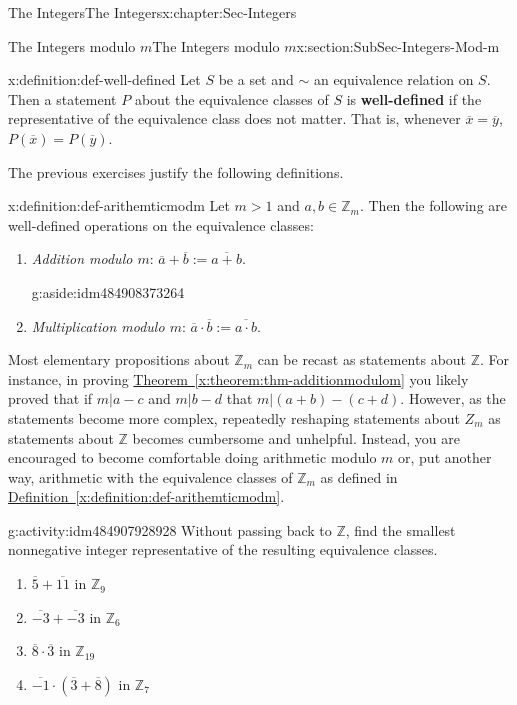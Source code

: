 \documentclass[oneside,10pt,]{book}
\newcommand{\xreffont}{\relax}
\newcommand{\terminology}[1]{\textbf{#1}}
\numberwithin{equation}{section}
\def\Z{{\mathbb Z}}
\begin{document}
\begin{chapterptx}{The Integers}{}{The Integers}{}{}{x:chapter:Sec-Integers}
\begin{sectionptx}{The Integers modulo \(m\)}{}{The Integers modulo \(m\)}{}{}{x:section:SubSec-Integers-Mod-m}
\begin{definition}{}{x:definition:def-well-defined}
%
Let \(S\) be a set and \(\sim\) an equivalence relation on \(S\). Then a statement \(P\) about the equivalence classes of \(S\) is \terminology{well-defined} if the representative of the equivalence class does not matter. That is, whenever \(\overline{x} = \overline{y}\), \(P(\overline{x}) = P(\overline{y})\).%
\end{definition}
The previous exercises justify the following definitions.%
\begin{definition}{}{x:definition:def-arithemticmodm}%
Let \(m > 1\) and \(a,b\in \Z_m\). Then the following are well-defined operations on the equivalence classes:%
\begin{enumerate}
\item{}\emph{Addition modulo \(m\)}: \(\overline{a} + \overline{b} := \overline{a+b}\). \begin{aside}{}{g:aside:idm484908373264}%
\end{aside}
%
\item{}\emph{Multiplication modulo \(m\)}: \(\overline{a}\cdot \overline{b} := \overline{a\cdot b}\).%
\end{enumerate}
%
\end{definition}
Most elementary propositions about \(\Z_m\) can be recast as statements about \(\Z\). For instance, in proving \hyperref[x:theorem:thm-additionmodulom]{Theorem~{\xreffont\ref{x:theorem:thm-additionmodulom}}} you likely proved that if \(m|a-c\) and \(m|b-d\) that \(m|(a+b)-(c+d)\). However, as the statements become more complex, repeatedly reshaping statements about \(Z_m\) as statements about \(\Z\) becomes cumbersome and unhelpful. Instead, you are encouraged to become comfortable doing arithmetic modulo \(m\) or, put another way, arithmetic with the equivalence classes of \(\Z_m\) as defined in \hyperref[x:definition:def-arithemticmodm]{Definition~{\xreffont\ref{x:definition:def-arithemticmodm}}}.%
\begin{activity}{}{g:activity:idm484907928928}%
Without passing back to \(\Z\), find the smallest nonnegative integer representative of the resulting equivalence classes.%
%
\begin{enumerate}
\item{}\(\overline{5}+\overline{11}\) in \(\Z_{9}\)%
\item{}\(\overline{-3}+\overline{-3}\) in \(\Z_{6}\)%
\item{}\(\overline{8}\cdot\overline{3}\) in \(\Z_{19}\)%
\item{}\(\overline{-1}\cdot(\overline{3}+\overline{8})\) in \(\Z_{7}\)%

\end{enumerate}
\end{activity}
\end{sectionptx}
\end{chapterptx}
\end{document}
